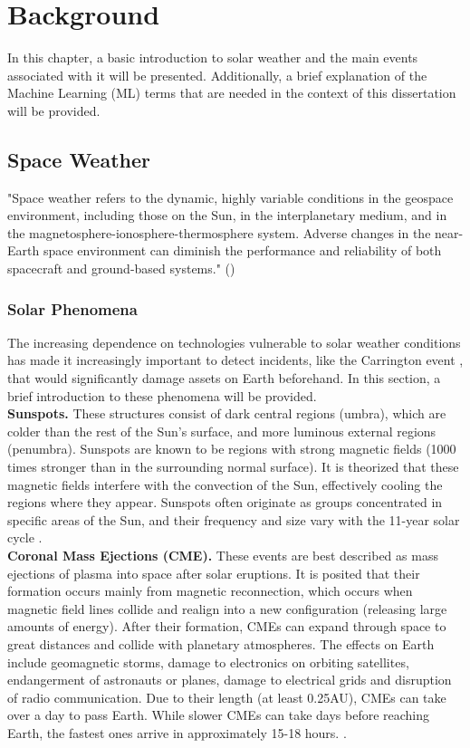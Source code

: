 \chapter{Background}\label{chap:background}
In this chapter, a basic introduction to solar weather and the main events associated with it will be presented. Additionally, a brief explanation of the Machine Learning (ML) terms that are needed in the context of this dissertation will be provided.

\section{Space Weather}
"Space weather refers to the dynamic, highly variable conditions in the geospace environment, including those on the Sun, in the interplanetary medium, and in the magnetosphere-ionosphere-thermosphere system. Adverse changes in the near-Earth space environment can diminish the performance and reliability of both spacecraft and ground-based systems." (\cite{BAKER19987})

\subsection{Solar Phenomena}\label{sec:solar_events}
The increasing dependence on technologies vulnerable to solar weather conditions has made it increasingly important to detect incidents, like the Carrington event \cite{schwenn_SpaceWeatherSolar_2006}, that would significantly damage assets on Earth beforehand. In this section, a brief introduction to these phenomena will be provided.\\

\noindent\textbf{Sunspots.} These structures consist of dark central regions (umbra), which are colder than the rest of the Sun's surface, and more luminous external regions (penumbra). Sunspots are known to be regions with strong magnetic fields (1000 times stronger than in the surrounding normal surface). It is theorized that these magnetic fields interfere with the convection of the Sun, effectively cooling the regions where they appear. Sunspots often originate as groups concentrated in specific areas of the Sun, and their frequency and size vary with the 11-year solar cycle \cite{moldwin_2008}. \\


\noindent\textbf{Coronal Mass Ejections (CME).} These events are best described as mass ejections of plasma into space after solar eruptions. It is posited that their formation occurs mainly from magnetic reconnection, which occurs when magnetic field lines collide and realign into a new configuration (releasing large amounts of energy). After their formation, CMEs can expand through space to great distances and collide with planetary atmospheres. The effects on Earth include geomagnetic storms, damage to electronics on orbiting satellites, endangerment of astronauts or planes, damage to electrical grids and disruption of radio communication. Due to their length (at least 0.25AU), CMEs can take over a day to pass Earth. While slower CMEs can take days before reaching Earth, the fastest ones arrive in approximately 15-18 hours. \cite{priest_2014, moldwin_2008}.\\

